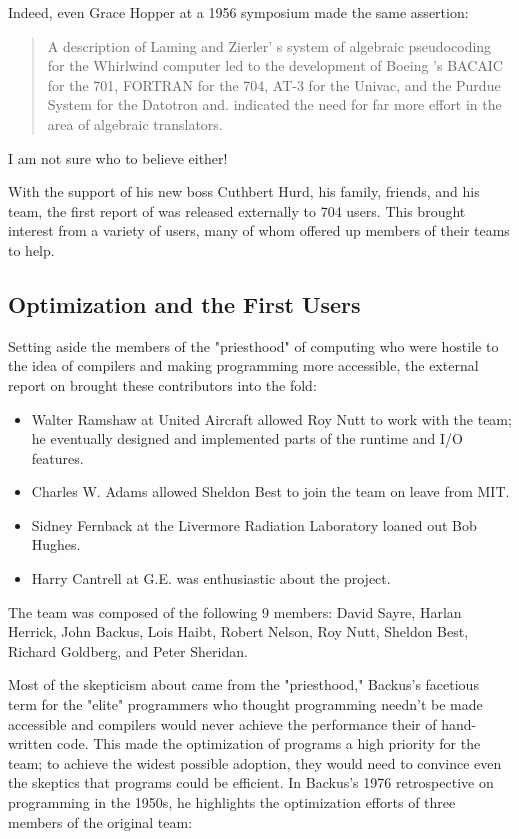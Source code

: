 Indeed, even Grace Hopper at a 1956 symposium made the same assertion:

\begin{quotation}
	A description of Laming and Zierler' s system of algebraic pseudocoding for
	the Whirlwind computer led to the development of Boeing 's BACAIC for the 701,
	FORTRAN for the 704, AT-3 for the Univac, and the Purdue System for the Datotron and. indicated the need for far more effort in the area of algebraic
	translators.
	\cite{Knuth_TrabbPardo_1976_Early_Development}
\end{quotation}

I am not sure who to believe either!

With the support of his new boss Cuthbert Hurd, his family, friends, and his
team, the first report of \FTN{} was released externally to 704 users. This
brought interest from a variety of users, many of whom offered up members of
their teams to help.

\subsection{\FTN{} Optimization and the First Users}

Setting aside the members of the "priesthood" of computing who were hostile to
the idea of compilers and making programming more accessible, the external
report on \FTN{} brought these contributors into the fold:
\begin{itemize}
	\item Walter Ramshaw at United Aircraft allowed Roy Nutt to work
	      with the team; he
	      eventually designed and implemented parts of the runtime and I/O features.
	\item Charles W. Adams allowed Sheldon Best to join the team on
	      leave from MIT.
	\item Sidney Fernback at the Livermore Radiation Laboratory loaned
	      out Bob Hughes.
	\item Harry Cantrell at G.E. was enthusiastic about the project.
\end{itemize}

The team was composed of the following 9 members: David Sayre, Harlan Herrick,
John Backus, Lois Haibt, Robert Nelson, Roy Nutt, Sheldon Best, Richard
Goldberg, and Peter Sheridan.

Most of the skepticism about \FTN{} came from the "priesthood," Backus's
facetious term for the "elite" programmers who thought programming needn't be
made accessible and compilers would never achieve the performance their of
hand-written code. This made the optimization of \FTN{} programs a high
priority for the team; to achieve the widest possible adoption, they would need
to convince even the skeptics that \FTN{} programs could be efficient. In
Backus's 1976 retrospective on programming in the
1950s\cite{Backus_1980_Programming_in_America_in_1950s}, he highlights the
optimization efforts of three members of the original team:

